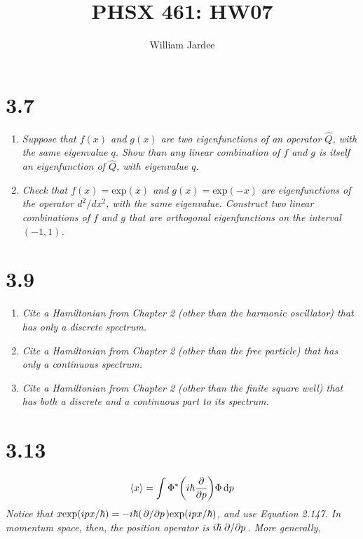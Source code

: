 \documentclass[12pt]{article}
\begin{document}
\title{PHSX 461: HW07}
\author{William Jardee}
\maketitle

\section*{3.7}
\begin{enumerate}[label=\alph*)]
\item \emph{Suppose that $f(x)$ and $g(x)$ are two eigenfunctions of an operator $\hat{Q}$, with the same eigenvalue $q$. Show than any linear combination of $f$ and $g$ is itself an eigenfunction of $\hat{Q}$, with eigenvalue $q$.}\bigskip

\item \emph{Check that $f(x) = \text{exp} (x)$ and $g(x) = \text{exp} (-x)$ are eigenfunctions of the operator $d^2/dx^2$, with the same eigenvalue. Construct two linear combinations of $f$ and $g$ that are orthogonal eigenfunctions on the interval $(-1,1)$.}
\end{enumerate}

\newpage

\section*{3.9}
\begin{enumerate}[label=\alph*)]
\item \emph{Cite a Hamiltonian from Chapter 2 (other than the harmonic oscillator) that has only a discrete spectrum.}\bigskip

\item \emph{Cite a Hamiltonian from Chapter 2 (other than the free particle) that has only a continuous spectrum.}\bigskip

\item \emph{Cite a Hamiltonian from Chapter 2 (other than the finite square well) that has both a discrete and a continuous part to its spectrum.}
\end{enumerate}

\newpage

\section*{3.13}
\[\langle x \rangle = \int \Phi^* \qty(i\hbar\pdv{p})\Phi \dd{p}\]
\emph{Notice that $x\text{exp}(ipx/\hbar) = -i\hbar (\pdv*{p})\text{exp} (ipx/\hbar)$, and use Equation 2.147. In momentum space, then, the position operator is $i\hbar \pdv*{p}$. More generally,}\bigskip
\end{document}

